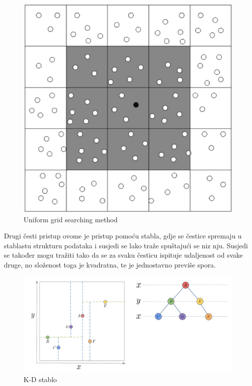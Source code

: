 \documentclass[diplomskirad]{fer}
\begin{document}
    \begin{figure}[H]
        \centering
        \includegraphics[scale=0.3]{images/Uniform-grid-searching-method}
        \caption{
            Uniform grid searching method \cite{uniformGridSearchingMethod}
        }
        \label{fig:uniformGridSearchingMethod}
    \end{figure}

    \newpage
    Drugi česti pristup ovome je pristup pomoću stabla, gdje se čestice spremaju u stablastu strukturu podataka i susjedi se lako traže spuštajući se niz nju.
    Susjedi se također mogu tražiti tako da se za svaku česticu ispituje udaljenost od svake druge, no složenost toga je kvadratna, te je jednostavno previše spora.

    \begin{figure}[H]
        \centering
        \includegraphics[scale=0.3]{images/kdtree}
        \caption{
            K-D stablo \cite{kdTree}
        }
        \label{fig:kdTree}
    \end{figure}
\end{document}
